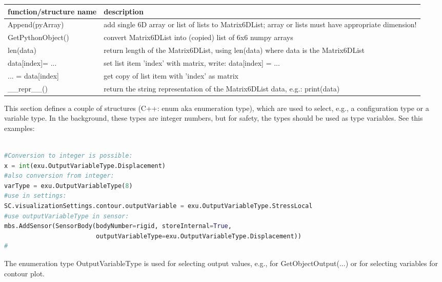 \begin{center}
\footnotesize
\begin{longtable}{| p{8cm} | p{8cm} |} 
\hline
{\bf function/structure name} & {\bf description}\\ \hline
  Append(pyArray) & add single 6D array or list of lists to Matrix6DList; array or lists must have appropriate dimension!\\ \hline 
  GetPythonObject() & convert Matrix6DList into (copied) list of 6x6 numpy arrays\\ \hline 
  len(data) & return length of the Matrix6DList, using len(data) where data is the Matrix6DList\\ \hline 
  data[index]= ... & set list item 'index' with matrix, write: data[index] = ...\\ \hline 
  ... = data[index] & get copy of list item with 'index' as matrix\\ \hline 
  \_\_repr\_\_() & return the string representation of the Matrix6DList data, e.g.: print(data)\\ \hline 
\end{longtable}
\end{center}

\label{sec:cinterface:typedef}
This section defines a couple of structures (C++: enum aka enumeration type), which are used to select, e.g., a configuration type or a variable type. In the background, these types are integer numbers, but for safety, the types should be used as type variables. See this examples:

\pythonstyle
\begin{lstlisting}[language=Python, firstnumber=1]

#Conversion to integer is possible: 
x = int(exu.OutputVariableType.Displacement)
#also conversion from integer: 
varType = exu.OutputVariableType(8)
#use in settings:
SC.visualizationSettings.contour.outputVariable = exu.OutputVariableType.StressLocal
#use outputVariableType in sensor:
mbs.AddSensor(SensorBody(bodyNumber=rigid, storeInternal=True,
                         outputVariableType=exu.OutputVariableType.Displacement))
#
\end{lstlisting}


\label{sec:OutputVariableType}
The enumeration type  OutputVariableType is used for selecting output values, e.g., for GetObjectOutput(...) or for selecting variables for contour plot.

